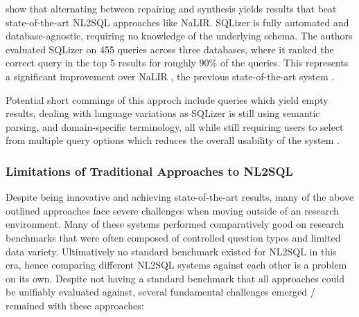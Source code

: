 \citeauthor*{SQLizer} show that alternating between repairing and synthesis yields results that beat state-of-the-art
NL2SQL approaches like NaLIR. SQLizer is fully automated and database-agnostic, requiring no knowledge of the underlying
schema. The authors evaluated SQLizer on 455 queries across three databases, where it ranked the correct query in the
top 5 results for roughly 90\% of the queries. This represents a significant improvement over NaLIR \citep{NALIR},
the previous state-of-the-art system \citep{SQLizer}.

Potential short commings of this approch include queries which yield empty results, dealing with language variations
as SQLizer is still using semantic parsing, and domain-specific terminology, all while still requiring users
to select from multiple query options which reduces the overall usability of the system \citep[p.22-23]{SQLizer}.

\subsubsection{Limitations of Traditional Approaches to NL2SQL}

Despite being innovative and achieving state-of-the-art results, many of the above outlined approaches face severe 
challenges when moving outside of an research environment. Many of these systems performed comparatively good on research
benchmarks that were often composed of controlled question types and limited data variety. Ultimatively no standard
benchmark existed for NL2SQL in this era, hence comparing different NL2SQL systems against each other is a problem on 
its own. Despite not having a standard benchmark that all approaches could be unifiably evaluated against, several 
fundamental challenges emerged / remained with these approaches:


